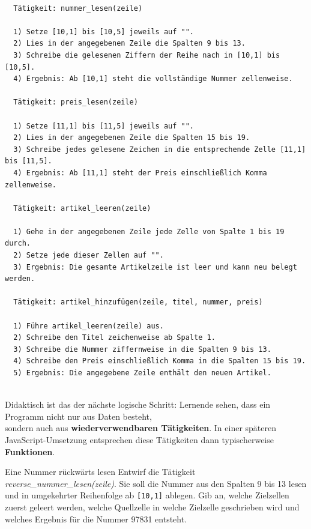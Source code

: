 \documentclass{article}
\begin{document}
        \begin{verbatim}

  Tätigkeit: nummer_lesen(zeile)

  1) Setze [10,1] bis [10,5] jeweils auf "".
  2) Lies in der angegebenen Zeile die Spalten 9 bis 13.
  3) Schreibe die gelesenen Ziffern der Reihe nach in [10,1] bis [10,5].
  4) Ergebnis: Ab [10,1] steht die vollständige Nummer zellenweise.

  Tätigkeit: preis_lesen(zeile)

  1) Setze [11,1] bis [11,5] jeweils auf "".
  2) Lies in der angegebenen Zeile die Spalten 15 bis 19.
  3) Schreibe jedes gelesene Zeichen in die entsprechende Zelle [11,1] bis [11,5].
  4) Ergebnis: Ab [11,1] steht der Preis einschließlich Komma zellenweise.

  Tätigkeit: artikel_leeren(zeile)

  1) Gehe in der angegebenen Zeile jede Zelle von Spalte 1 bis 19 durch.
  2) Setze jede dieser Zellen auf "".
  3) Ergebnis: Die gesamte Artikelzeile ist leer und kann neu belegt werden.

  Tätigkeit: artikel_hinzufügen(zeile, titel, nummer, preis)

  1) Führe artikel_leeren(zeile) aus.
  2) Schreibe den Titel zeichenweise ab Spalte 1.
  3) Schreibe die Nummer ziffernweise in die Spalten 9 bis 13.
  4) Schreibe den Preis einschließlich Komma in die Spalten 15 bis 19.
  5) Ergebnis: Die angegebene Zeile enthält den neuen Artikel.
        
\end{verbatim}

        
Didaktisch ist das der nächste logische Schritt: Lernende sehen, dass ein Programm nicht nur aus Daten besteht,\\
          sondern auch aus \textbf{wiederverwendbaren Tätigkeiten}. In einer späteren JavaScript-Umsetzung entsprechen diese Tätigkeiten dann typischerweise \textbf{Funktionen}.

\begin{uebung}{Eine Nummer rückwärts lesen}
Entwirf die Tätigkeit \emph{reverse\_nummer\_lesen(zeile)}. Sie soll die Nummer aus den Spalten 9 bis 13 lesen und in umgekehrter Reihenfolge ab \texttt{[10,1]} ablegen. Gib an, welche Zielzellen zuerst geleert werden, welche Quellzelle in welche Zielzelle geschrieben wird und welches Ergebnis für die Nummer 97831 entsteht.
\end{uebung}

      
    
\end{document}
